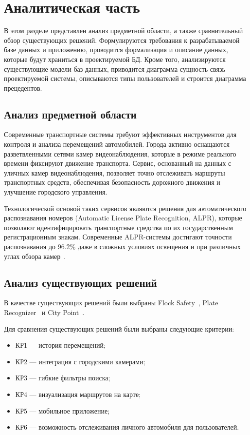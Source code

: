 \chapter{Аналитическая часть}

В этом разделе представлен анализ предметной области, а также сравнительный обзор существующих решений. Формулируются требования к разрабатываемой базе данных и приложению, проводится формализация и описание данных, которые будут храниться в проектируемой БД. Кроме того, анализируются существующие модели баз данных, приводится диаграмма сущность-связь проектируемой системы, описываются типы пользователей и строится диаграмма прецедентов.

\section{Анализ предметной области}

Современные транспортные системы требуют эффективных инструментов для контроля и анализа перемещений автомобилей. Города активно оснащаются разветвленными сетями камер видеонаблюдения, которые в режиме реального времени фиксируют движение транспорта. Сервис, основанный на данных с уличных камер видеонаблюдения, позволяет точно отслеживать маршруты транспортных средств, обеспечивая безопасность дорожного движения и улучшение городского управления.

Технологической основой таких сервисов являются решения для автоматического распознавания номеров (Automatic License Plate Recognition, ALPR), которые позволяют идентифицировать транспортные средства по их государственным регистрационным знакам. Современные ALPR-системы достигают точности распознавания до 96.2\% даже в сложных условиях освещения и при различных углах обзора камер~\cite{ALRP}.

\section{Анализ существующих решений}

В качестве существующих решений были выбраны Flock Safety~\cite{fl-safe}, Plate Recognizer~\cite{pl-rc} и City Point~\cite{city-point}.

Для сравнения существующих решений были выбраны следующие критерии:

\begin{itemize}[label=---]
    \item КР1 --- история перемещений;
    \item КР2 --- интеграция с городскими камерами;
    \item КР3 --- гибкие фильтры поиска;
    \item КР4 --- визуализация маршрутов на карте;
    \item КР5 --- мобильное приложение;
    \item КР6 --- возможность отслеживания личного автомобиля для пользователей.
\end{itemize}

